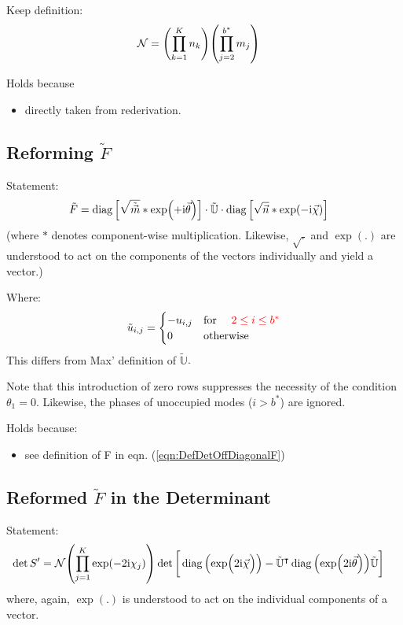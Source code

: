 \documentclass[
	english,
	a4paper,
	fontsize=10pt,
	parskip=half,
	titlepage=true,
	DIV=12,
	final
]{scrreprt}
\newcommand*{\transp}{\ensuremath{^\intercal}}
\newcommand*{\iunit}{\ensuremath{\mathrm{i}}}
\DeclareMathOperator{\diag}{diag}
\begin{document}
Keep definition:
\begin{align}
	\mathcal{N}
&=
	\qty( \prod_{k=1}^{K}   n_k )
	\qty( \prod_{j=2}^{b^*} m_j )
\label{eqn:DefN}
\end{align}

Holds because
\begin{itemize}
\item directly taken from rederivation.
\end{itemize}

\subsection{Reforming $\tilde{F}$}
Statement:
\begin{align}
	\tilde{F}
&=
	\diag\qty[ \sqrt{ \tilde{\vec{m}}} * \exp(+\iunit \vec{\theta}) ]
	\cdot \tilde{\mathbb{U}} \cdot
	\diag\qty[ \sqrt{        \vec{n} } * \exp(-\iunit \vec{\chi  }) ]
\end{align}
(where $*$ denotes component-wise multiplication. Likewise, $\sqrt{.}$ and $\exp(.)$ are understood to act on the components of the vectors individually and yield a vector.)

Where:
\begin{equation}
	\tilde{u}_{i,j} = \begin{cases}
		-u_{i,j}		&\qq*{for } {\color{red} 2 \leq i \leq b^*} \\
		0			&\qotherwise*
	\end{cases}
\end{equation}
{\color{red} This differs from Max' definition of $\tilde{\mathbb{U}}$}.

Note that this introduction of zero rows suppresses the necessity of the condition $\theta_1 = 0$. Likewise, the phases of unoccupied modes ($i > b^*$) are ignored.

Holds because:
\begin{itemize}
\item see definition of F in eqn. (\ref{eqn:DefDetOffDiagonalF})
\end{itemize}

\subsection{Reformed $\tilde{F}$ in the Determinant}
Statement:
\begin{align}
	\det S'
&=
	\mathcal{N}
	\qty( \prod_{j=1}^{K} \exp(-2\iunit \chi_j) )
	\det\qty[\bigg.
		\diag\qty(\exp(\Big.2\iunit\vec{\chi}))
		-
		\tilde{\mathbb{U}}\transp
		\diag\qty(\exp(2\iunit\vec{\theta}))
		\tilde{\mathbb{U}}
	]
\end{align}
where, again, $\exp(.)$ is understood to act on the individual components of a vector.
\end{document}
